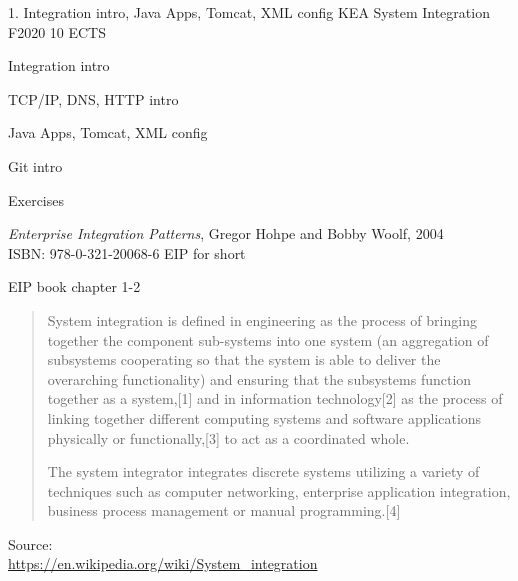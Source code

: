 \documentclass[Screen16to9,17pt]{foils}
\begin{document}
\mytitlepage
{1. Integration intro, Java Apps, Tomcat, XML config}
{KEA System Integration F2020 10 ECTS}


\begin{list2}
\item Integration intro
\item TCP/IP, DNS, HTTP intro

\item Java Apps, Tomcat, XML config

\item Git intro
\end{list2}

Exercises
\begin{list2}
\item
\item
\end{list2}





\emph{Enterprise Integration Patterns}, Gregor Hohpe and Bobby Woolf, 2004\\
ISBN: 978-0-321-20068-6 EIP for short

\begin{list1}
\item EIP book chapter 1-2
\end{list1}


\begin{quote}
  System integration is defined in engineering as the process of bringing together the component sub-systems into one system (an aggregation of subsystems cooperating so that the system is able to deliver the overarching functionality) and ensuring that the subsystems function together as a system,[1] and in information technology[2] as the process of linking together different computing systems and software applications physically or functionally,[3] to act as a coordinated whole.

  The system integrator integrates discrete systems utilizing a variety of techniques such as computer networking, enterprise application integration, business process management or manual programming.[4]
\end{quote}

Source:\\
\url{https://en.wikipedia.org/wiki/System_integration}
\end{document}
